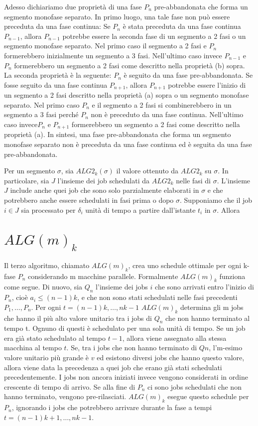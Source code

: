 \documentclass[12pt]{article}
\begin{document}
Adesso dichiariamo due proprietà di una fase $P_{n}$ pre-abbandonata che forma un segmento monofase separato. In primo luogo, una tale fase non può essere preceduta da una fase continua: Se $P_{n}$ è stata preceduta da una fase continua $P_{n-1}$, allora $P_{n-1}$ potrebbe essere la seconda fase di un segmento a 2 fasi o un segmento monofase separato. Nel primo caso il segmento a 2 fasi e $P_{n}$ formerebbero inizialmente un segmento a 3 fasi. Nell'ultimo caso invece $P_{n-1}$ e $P_{n}$ formerebbero un segmento a 2 fasi come descritto nella proprietà (b) sopra. La seconda proprietà è la seguente: $P_{n}$ è seguito da una fase pre-abbandonata. Se fosse seguito da una fase continua $P_{n+1}$, allora $P_{n+1}$ potrebbe essere l'inizio di un segmento a 2 fasi descritto nella proprietà (a) sopra o un segmento monofase separato. Nel primo caso $P_{n}$ e il segmento a 2 fasi si combinerebbero in un segmento a 3 fasi perché $P_{n}$ non è preceduto da una fase continua. Nell'ultimo caso invece$P_{n}$ e $P_{n+1}$ formerebbero un segmento a 2 fasi come descritto nella proprietà (a). In sintesi, una fase pre-abbandonata che forma un segmento monofase separato non è preceduta da una fase continua ed è seguita da una fase pre-abbandonata.

Per un segmento $\sigma$, sia $ALG2_{k}(\sigma)$ il valore ottenuto da $ALG2_{k}$ su $\sigma$. In particolare, sia $J$ l'insieme dei job schedulati da $ALG2_{k}$ nelle fasi di $\sigma$. L'insieme $J$ include anche quei job che sono solo parzialmente elaborati in $\sigma$ e che potrebbero anche essere schedulati in fasi prima o dopo $\sigma$. Supponiamo che il job $i \in J$ sia processato per $\delta_{i}$ unità di tempo a partire dall'istante $t_{i}$ in $\sigma$. Allora

\section{$ALG(m)_{k}$}
Il terzo algoritmo, chiamato $ALG(m)_{k}$, crea uno schedule ottimale per ogni k-fase $P_{n}$ considerando m macchine parallele. Formalmente $ALG(m)_{k}$ funziona come segue. Di nuovo, sia $Q_{n}$ l’insieme dei jobs $i$ che sono arrivati entro l’inizio di $P_{n}$, cioè $a_{i} \leq (n - 1)k$, e che non sono stati schedulati nelle fasi precedenti $P_{1}, … , P_{n}$. Per ogni $t = (n-1)k, … , nk - 1$ $ALG(m)_{k}$ determina gli m jobs che hanno il più alto valore unitario tra i jobs di $Q_{n}$ che non hanno terminato al tempo t. Ognuno di questi è schedulato per una sola unità di tempo. Se un job era già stato schedulato al tempo $t-1$, allora viene assegnato alla stessa macchina al tempo $t$. Se, tra i jobs che non hanno terminato di $Qn$, l’m-esimo valore unitario più grande è $v$ ed esistono diversi jobs che hanno questo valore, allora viene data la precedenza a quei job che erano già stati schedulati precedentemente. I jobs non ancora iniziati invece vengono considerati in ordine crescente di tempo di arrivo. Se alla fine di $P_{n}$ ci sono jobs schedulati che non hanno terminato, vengono pre-rilasciati. $ALG(m)_{k}$ esegue questo schedule per $P_{n}$, ignorando i jobs che potrebbero arrivare durante la fase a tempi $t = (n-1)k + 1, …, nk - 1$.
\end{document}
